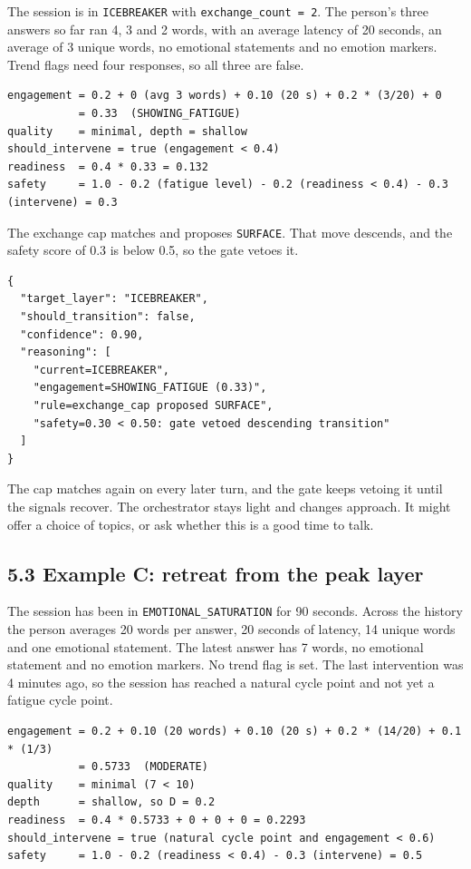 \documentclass[11pt]{article}
\begin{document}
The session is in \texttt{ICEBREAKER} with
\texttt{exchange\_\allowbreak{}count\ =\ 2}. The person's three answers so far ran 4,
3 and 2 words, with an average latency of 20 seconds, an average of 3
unique words, no emotional statements and no emotion markers. Trend
flags need four responses, so all three are false.

\begin{verbatim}
engagement = 0.2 + 0 (avg 3 words) + 0.10 (20 s) + 0.2 * (3/20) + 0
           = 0.33  (SHOWING_FATIGUE)
quality    = minimal, depth = shallow
should_intervene = true (engagement < 0.4)
readiness  = 0.4 * 0.33 = 0.132
safety     = 1.0 - 0.2 (fatigue level) - 0.2 (readiness < 0.4) - 0.3 (intervene) = 0.3
\end{verbatim}

The exchange cap matches and proposes \texttt{SURFACE}. That move
descends, and the safety score of 0.3 is below 0.5, so the gate vetoes
it.

\begin{verbatim}
{
  "target_layer": "ICEBREAKER",
  "should_transition": false,
  "confidence": 0.90,
  "reasoning": [
    "current=ICEBREAKER",
    "engagement=SHOWING_FATIGUE (0.33)",
    "rule=exchange_cap proposed SURFACE",
    "safety=0.30 < 0.50: gate vetoed descending transition"
  ]
}
\end{verbatim}

The cap matches again on every later turn, and the gate keeps vetoing it
until the signals recover. The orchestrator stays light and changes
approach. It might offer a choice of topics, or ask whether this is a
good time to talk.

\subsection{5.3 Example C: retreat from the peak layer}

The session has been in \texttt{EMOTIONAL\_\allowbreak{}SATURATION} for 90 seconds.
Across the history the person averages 20 words per answer, 20 seconds
of latency, 14 unique words and one emotional statement. The latest
answer has 7 words, no emotional statement and no emotion markers. No
trend flag is set. The last intervention was 4 minutes ago, so the
session has reached a natural cycle point and not yet a fatigue cycle
point.

\begin{verbatim}
engagement = 0.2 + 0.10 (20 words) + 0.10 (20 s) + 0.2 * (14/20) + 0.1 * (1/3)
           = 0.5733  (MODERATE)
quality    = minimal (7 < 10)
depth      = shallow, so D = 0.2
readiness  = 0.4 * 0.5733 + 0 + 0 + 0 = 0.2293
should_intervene = true (natural cycle point and engagement < 0.6)
safety     = 1.0 - 0.2 (readiness < 0.4) - 0.3 (intervene) = 0.5
\end{verbatim}
\end{document}
